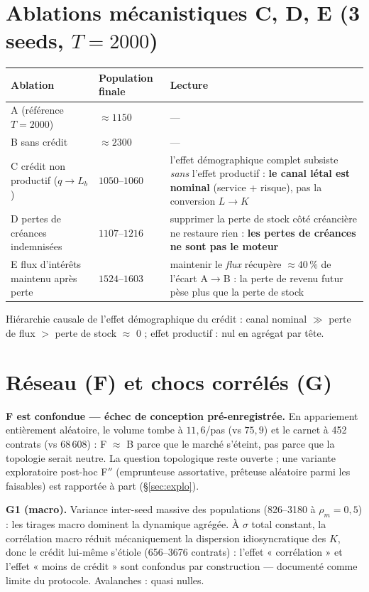 \documentclass[11pt,a4paper]{article}
\begin{document}
\section{Ablations mécanistiques C, D, E (3 seeds, $T = 2000$)}

\begin{center}
\small
\setlength{\tabcolsep}{4pt}
\begin{tabularx}{\textwidth}{@{}p{3.2cm}p{2.8cm}X@{}}
\toprule
Ablation & Population finale & Lecture \\
\midrule
A (référence $T{=}2000$) & $\approx 1150$ & --- \\
B sans crédit & $\approx 2300$ & --- \\
C crédit non productif ($q \to L_b$) & $1050$--$1060$ &
l'effet démographique complet subsiste \emph{sans} l'effet productif :
\textbf{le canal létal est nominal} (service + risque), pas la conversion
$L \to K$ \\
D pertes de créances indemnisées & $1107$--$1216$ &
supprimer la perte de stock côté créancière ne restaure rien :
\textbf{les pertes de créances ne sont pas le moteur} \\
E flux d'intérêts maintenu après perte & $1524$--$1603$ &
maintenir le \emph{flux} récupère $\approx 40\,\%$ de l'écart A$\to$B :
la perte de revenu futur pèse plus que la perte de stock \\
\bottomrule
\end{tabularx}
\end{center}

Hiérarchie causale de l'effet démographique du crédit :
canal nominal $\gg$ perte de flux $>$ perte de stock $\approx$ 0 ;
effet productif : nul en agrégat par tête.

\section{Réseau (F) et chocs corrélés (G)}

\textbf{F est confondue — échec de conception pré-enregistrée.} En
appariement entièrement aléatoire, le volume tombe à $11{,}6$/pas (vs
$75{,}9$) et le carnet à 452 contrats (vs $68\,608$) : F $\approx$ B parce
que le marché s'éteint, pas parce que la topologie serait neutre. La
question topologique reste ouverte ; une variante exploratoire post-hoc
F$''$ (emprunteuse assortative, prêteuse aléatoire parmi les faisables) est
rapportée à part (§\ref{sec:explo}).

\textbf{G1 (macro).} Variance inter-seed massive des populations (826--3180
à $\rho_m = 0{,}5$) : les tirages macro dominent la dynamique agrégée. À
$\sigma$ total constant, la corrélation macro réduit mécaniquement la
dispersion idiosyncratique des $K$, donc le crédit lui-même s'étiole
(656--3676 contrats) : l'effet « corrélation » et l'effet « moins de
crédit » sont confondus par construction — documenté comme limite du
protocole. Avalanches : quasi nulles.
\end{document}
